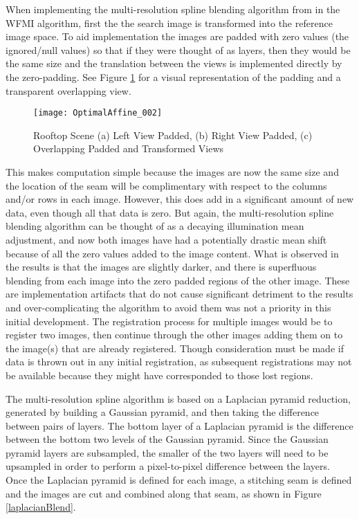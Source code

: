 When implementing the multi-resolution spline blending algorithm from \cite{Burt1983} in the WFMI algorithm, first the the search image is transformed into the reference image space. To aid implementation the images are padded with zero values (the ignored/null values) so that if they were thought of as layers, then they would be the same size and the translation between the views is implemented directly by the zero-padding. See Figure \ref{OverlappingViews} for a visual representation of the padding and a transparent overlapping view.

\begin{figure}[h]
\centering
\texttt{[image: OptimalAffine\_002]}
\caption{Rooftop Scene (a) Left View Padded, (b) Right View Padded, (c) Overlapping Padded and Transformed Views}
\label{OverlappingViews}
\end{figure}

This makes computation simple because the images are now the same size and the location of the seam will be complimentary with respect to the columns and/or rows in each image. However, this does add in a significant amount of new data, even though all that data is zero. But again, the multi-resolution spline blending algorithm can be thought of as a decaying illumination mean adjustment, and now both images have had a potentially drastic mean shift because of all the zero values added to the image content. What is observed in the results is that the images are slightly darker, and there is superfluous blending from each image into the zero padded regions of the other image. These are implementation artifacts that do not cause significant detriment to the results and over-complicating the algorithm to avoid them was not a priority in this initial development. The registration process for multiple images would be to register two images, then continue through the other images adding them on to the image(s) that are already registered. Though consideration must be made if data is thrown out in any initial registration, as subsequent registrations may not be available because they might have corresponded to those lost regions.

The multi-resolution spline algorithm is based on a Laplacian pyramid reduction, generated by building a Gaussian pyramid, and then taking the difference between pairs of layers. The bottom layer of a Laplacian pyramid is the difference between the bottom two levels of the Gaussian pyramid. Since the Gaussian pyramid layers are subsampled, the smaller of the two layers will need to be upsampled in order to perform a pixel-to-pixel difference between the layers. Once the Laplacian pyramid is defined for each image, a stitching seam is defined and the images are cut and combined along that seam, as shown in Figure \ref{laplacianBlend}.


